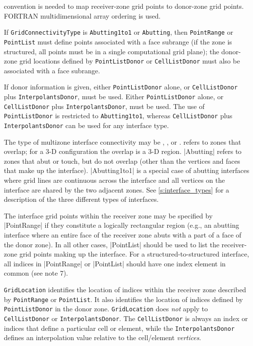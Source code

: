 \begin{notes}
      convention is needed to map receiver-zone grid points to
      donor-zone grid points.
      FORTRAN multidimensional array ordering is used.
\item If \texttt{GridConnectivityType} is \texttt{Abutting1to1} or
      \texttt{Abutting}, then \texttt{PointRange} or \texttt{PointList}
      must define points associated with a face subrange (if
      the zone is structured, all points must be in a single
      computational grid plane); the donor-zone grid locations defined
      by \texttt{PointListDonor} or \texttt{CellListDonor} must also be
      associated with a face subrange.
\item If donor information is given, either \texttt{PointListDonor}
      alone, or \texttt{CellListDonor} plus \texttt{InterpolantsDonor},
      must be used.
      Either \texttt{PointListDonor} alone, or \texttt{CellListDonor}
      plus \texttt{InterpolantsDonor}, must be used.
      The use of \texttt{PointListDonor} is restricted to
      \texttt{Abutting1to1}, whereas \texttt{CellListDonor} plus
      \texttt{InterpolantsDonor} can be used for any interface type.
\end{notes}

The type of multizone interface connectivity may be ,
, or .
 refers to zones that overlap; for a 3-D configuration the
overlap is a 3-D region.
|Abutting| refers to zones that abut or touch, but do not overlap (other
than the vertices and faces that make up the interface).
|Abutting1to1| is a special case of abutting interfaces where grid lines
are continuous across the interface and all vertices on the interface
are shared by the two adjacent zones.
See \autoref{s:interface_types} for a description of the three different
types of interfaces.

The interface grid points within the receiver zone may be specified by
|PointRange| if they constitute a logically rectangular region (e.g., an
abutting interface where an entire face of the receiver zone abuts with a
part of a face of the donor zone).  In all other cases, |PointList| should be
used to list the receiver-zone grid points making up the interface.
For a structured-to-structured interface, all indices in |PointRange| or
|PointList| should have one index element in common (see note 7).

\texttt{GridLocation} identifies the location of indices within the
receiver zone described by \texttt{PointRange} or \texttt{PointList}.
It also identifies the location of indices defined by
\texttt{PointListDonor} in the donor zone.
\texttt{GridLocation} does \emph{not} apply to \texttt{CellListDonor} or 
\texttt{InterpolantsDonor}.
The \texttt{CellListDonor} is always an index or indices that define a
particular cell or element, while the \texttt{InterpolantsDonor} defines
an interpolation value relative to the cell/element \emph{vertices}.

